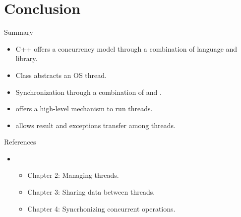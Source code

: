 \section{Conclusion}

\begin{frame}[t]{Summary}
\begin{itemize}
  \item C++ offers a concurrency model through a combination of
        language and library.
  \item Class  abstracts an OS thread.
  \item Synchronization through a combination of  and .
  \item {} offers a high-level mechanism to run threads.
  \item {} allows result and exceptions transfer among threads.
\end{itemize}
\end{frame}

\begin{frame}[t]{References}
\begin{itemize}
  \item \bibwilliams
    \begin{itemize}
      \item Chapter 2: Managing threads.
      \item Chapter 3: Sharing data between threads.
      \item Chapter 4: Syncrhonizing concurrent operations.
    \end{itemize}
\end{itemize}
\end{frame}
